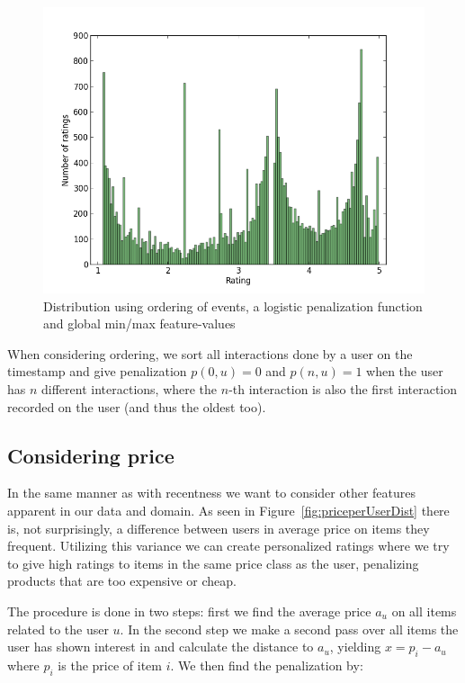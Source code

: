 \begin{figure}[H]
  \centering
  \includegraphics[scale=0.5]{image/dist-sigmoid-fixed-count-3-5}
  \caption[Distribution using ordering of events w/logistic penalization]{Distribution using ordering of events, a logistic penalization
  function and global min/max feature-values}
  \label{fig:dist-count-sigmoid}
\end{figure}

When considering ordering, we sort all interactions done by a user on the
timestamp and give penalization $p(0,u) = 0$ and $p(n,u) = 1$ when the user has
$n$ different interactions, where the $n$-th interaction is also the first
interaction recorded on the user (and thus the oldest too).

\subsection{Considering price}

In the same manner as with recentness we want to consider other features
apparent in our data and domain. As seen in Figure~\ref{fig:priceperUserDist}
there is, not surprisingly, a difference between users in average price on
items they frequent. Utilizing this variance we can create personalized ratings
where we try to give high ratings to items in the same price class as the user,
penalizing products that are too expensive or cheap.

The procedure is done in two steps: first we find the average price $a_u$ on
all items related to the user $u$. In the second step we make a second pass
over all items the user has shown interest in and calculate the distance to
$a_u$, yielding $x = p_i - a_u$ where $p_i$ is the price of item $i$. We then
find the penalization by:

